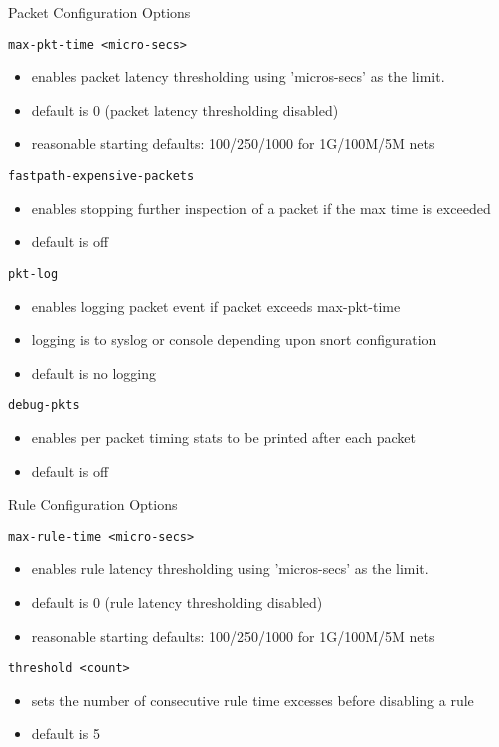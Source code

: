 \documentclass[english]{report}
\begin{document}
Packet Configuration Options

\texttt{max-pkt-time <micro-secs>}
\begin{itemize}
\item enables packet latency thresholding using 'micros-secs' as the limit.
\item default is 0 (packet latency thresholding disabled)
\item reasonable starting defaults: 100/250/1000 for 1G/100M/5M nets
\end{itemize}

\texttt{fastpath-expensive-packets}
\begin{itemize}
\item enables stopping further inspection of a packet if the max time is
      exceeded
\item default is off
\end{itemize}

\texttt{pkt-log}
\begin{itemize}
\item enables logging packet event if packet exceeds max-pkt-time
\item logging is to syslog or console depending upon snort configuration
\item default is no logging
\end{itemize}

\texttt{debug-pkts}
\begin{itemize}
\item enables per packet timing stats to be printed after each packet
\item default is off
\end{itemize}

Rule Configuration Options

\texttt{max-rule-time <micro-secs>}
\begin{itemize}
\item enables rule latency thresholding using 'micros-secs' as the limit.
\item default is 0 (rule latency thresholding disabled)
\item reasonable starting defaults: 100/250/1000 for 1G/100M/5M nets
\end{itemize}

\texttt{threshold <count>}
\begin{itemize}
\item sets the number of consecutive rule time excesses before disabling
      a rule
\item default is 5
\end{itemize}
\end{document}
